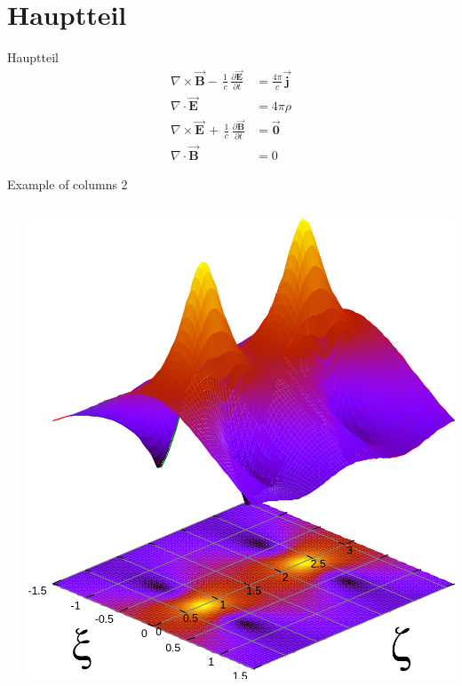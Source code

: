 \section{Hauptteil}

\begin{frame}{Hauptteil}
$$
\begin{aligned}
    \nabla \times \vec{\mathbf{B}} -\, \frac1c\, \frac{\partial\vec{\mathbf{E}}}{\partial t} & = \frac{4\pi}{c}\vec{\mathbf{j}} \\   \nabla \cdot \vec{\mathbf{E}} & = 4 \pi \rho \\
    \nabla \times \vec{\mathbf{E}}\, +\, \frac1c\, \frac{\partial\vec{\mathbf{B}}}{\partial t} & = \vec{\mathbf{0}} \\
    \nabla \cdot \vec{\mathbf{B}} & = 0
\end{aligned}
$$
\end{frame}

\begin{frame}{Example of columns 2}
     \begin{columns}[T]
         \begin{column}[T]{5cm}
            \lipsum[66]
         \end{column}
         \begin{column}[T]{5cm}
            \includegraphics[width=\textwidth]{resources/plot.png}
         \end{column}
     \end{columns}
\end{frame}